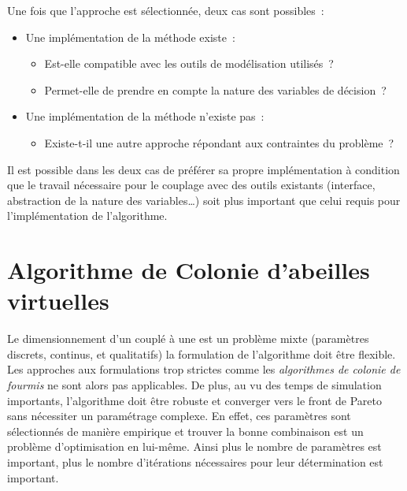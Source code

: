 \noindent
Une fois que l’approche est sélectionnée, deux cas sont possibles~:
\begin{itemize}
  \item Une implémentation de la méthode existe~:
    \begin{itemize}
      \item Est-elle compatible avec les outils de modélisation utilisés~?
      \item Permet-elle de prendre en compte la nature des variables de décision~?
    \end{itemize}
  \item Une implémentation de la méthode n’existe pas~:
    \begin{itemize}
        \item Existe-t-il une autre approche répondant aux contraintes du problème~?
    \end{itemize}
\end{itemize}

Il est possible dans les deux cas de préférer sa propre implémentation à condition
que le travail nécessaire pour le couplage avec des outils existants (interface,
abstraction de la nature des variables\dots) soit plus important
que celui requis pour l’implémentation de l’algorithme.




\section{Algorithme de Colonie d’abeilles virtuelles} %
\label{sec:algorithme_de_colonie_d_abeilles_virtuelles}
Le dimensionnement d’un  couplé à une  est un problème mixte (paramètres discrets, continus, et
qualitatifs) la formulation de l’algorithme doit être flexible. Les approches
aux formulations trop strictes comme les \textit{algorithmes de colonie de
fourmis} ne sont alors pas applicables. De plus, au vu des temps de simulation
importants, l’algorithme doit être robuste et converger vers le front de Pareto
sans nécessiter un paramétrage complexe. En effet, ces paramètres sont
sélectionnés de manière empirique et trouver la bonne combinaison est un
problème d’optimisation en lui-même. Ainsi plus le nombre de paramètres est important,
plus le nombre d’itérations nécessaires pour leur détermination est important.

